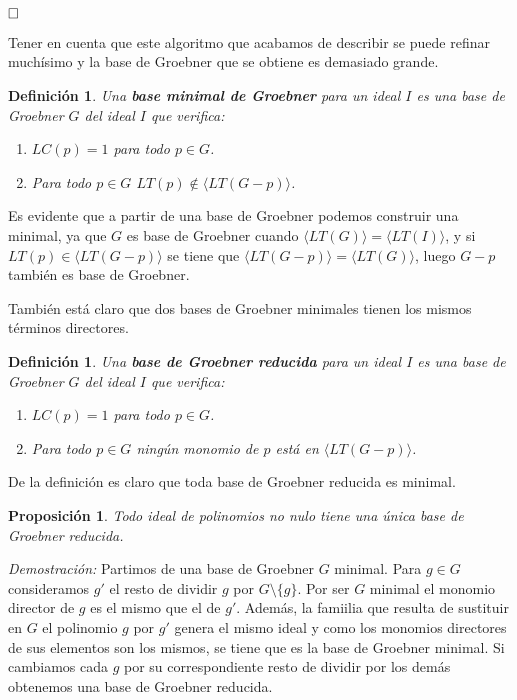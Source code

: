 \documentclass[12pt]{article}
\newtheorem{proposition}[theorem]{Proposición}
\newtheorem{definition}[theorem]{Definición}
\begin{document}
$\hfill \square$

Tener en cuenta que este algoritmo que acabamos de describir se puede refinar muchísimo y la base de Groebner que se obtiene es demasiado grande.

\begin{definition}Una \textbf{base minimal de Groebner} para un ideal $I$ es una base de Groebner $G$ del ideal $I$ que verifica: 
\begin{enumerate}
\item $LC(p) = 1$ para todo $p \in G$.
\item Para todo $p \in G$ $LT(p) \notin \langle LT(G-p) \rangle$.
\end{enumerate}
\end{definition}

Es evidente que a partir de una base de Groebner podemos construir una minimal, ya que $G$ es base de Groebner cuando $\langle LT(G) \rangle = \langle LT(I) \rangle$, y si $LT(p) \in \langle LT(G-p) \rangle $ se tiene que $\langle LT(G-p) \rangle = \langle LT(G) \rangle$, luego $G-p$ también es base de Groebner.

También está claro que dos bases de Groebner minimales tienen los mismos términos directores.

\begin{definition}Una \textbf{base de Groebner reducida} para un ideal $I$ es una base de Groebner $G$ del ideal $I$ que verifica:
\begin{enumerate}
\item $LC(p) = 1$ para todo $p \in G$.
\item Para todo $p \in G$ ningún monomio de $p$ está en $ \langle LT(G-p) \rangle$.
\end{enumerate}
\end{definition}

De la definición es claro que toda base de Groebner reducida es minimal. 

\begin{proposition}Todo ideal de polinomios no nulo tiene una única base de Groebner reducida.
\end{proposition}
\emph{Demostración: }Partimos de una base de Groebner $G$ minimal. Para $g \in G$ consideramos $g'$ el resto de dividir $g$ por $G\setminus \lbrace g \rbrace$. Por ser $G$ minimal el monomio director de $g$ es el mismo que el de $g'$. Además, la famiilia que resulta de sustituir en $G$ el polinomio $g$ por $g'$ genera el mismo ideal y como los monomios directores de sus elementos son los mismos, se tiene que es la base de Groebner minimal. Si cambiamos cada $g$ por su correspondiente resto de dividir por los demás obtenemos una base de Groebner reducida. 
\end{document}
